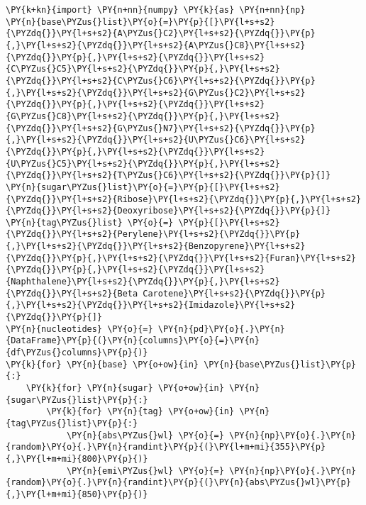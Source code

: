     \begin{tcolorbox}[breakable, size=fbox, boxrule=1pt, pad at break*=1mm,colback=cellbackground, colframe=cellborder]
\begin{Verbatim}[commandchars=\\\{\}]
\PY{k+kn}{import} \PY{n+nn}{numpy} \PY{k}{as} \PY{n+nn}{np}
\PY{n}{base\PYZus{}list}\PY{o}{=}\PY{p}{[}\PY{l+s+s2}{\PYZdq{}}\PY{l+s+s2}{A\PYZus{}C2}\PY{l+s+s2}{\PYZdq{}}\PY{p}{,}\PY{l+s+s2}{\PYZdq{}}\PY{l+s+s2}{A\PYZus{}C8}\PY{l+s+s2}{\PYZdq{}}\PY{p}{,}\PY{l+s+s2}{\PYZdq{}}\PY{l+s+s2}{C\PYZus{}C5}\PY{l+s+s2}{\PYZdq{}}\PY{p}{,}\PY{l+s+s2}{\PYZdq{}}\PY{l+s+s2}{C\PYZus{}C6}\PY{l+s+s2}{\PYZdq{}}\PY{p}{,}\PY{l+s+s2}{\PYZdq{}}\PY{l+s+s2}{G\PYZus{}C2}\PY{l+s+s2}{\PYZdq{}}\PY{p}{,}\PY{l+s+s2}{\PYZdq{}}\PY{l+s+s2}{G\PYZus{}C8}\PY{l+s+s2}{\PYZdq{}}\PY{p}{,}\PY{l+s+s2}{\PYZdq{}}\PY{l+s+s2}{G\PYZus{}N7}\PY{l+s+s2}{\PYZdq{}}\PY{p}{,}\PY{l+s+s2}{\PYZdq{}}\PY{l+s+s2}{U\PYZus{}C6}\PY{l+s+s2}{\PYZdq{}}\PY{p}{,}\PY{l+s+s2}{\PYZdq{}}\PY{l+s+s2}{U\PYZus{}C5}\PY{l+s+s2}{\PYZdq{}}\PY{p}{,}\PY{l+s+s2}{\PYZdq{}}\PY{l+s+s2}{T\PYZus{}C6}\PY{l+s+s2}{\PYZdq{}}\PY{p}{]}
\PY{n}{sugar\PYZus{}list}\PY{o}{=}\PY{p}{[}\PY{l+s+s2}{\PYZdq{}}\PY{l+s+s2}{Ribose}\PY{l+s+s2}{\PYZdq{}}\PY{p}{,}\PY{l+s+s2}{\PYZdq{}}\PY{l+s+s2}{Deoxyribose}\PY{l+s+s2}{\PYZdq{}}\PY{p}{]}
\PY{n}{tag\PYZus{}list} \PY{o}{=} \PY{p}{[}\PY{l+s+s2}{\PYZdq{}}\PY{l+s+s2}{Perylene}\PY{l+s+s2}{\PYZdq{}}\PY{p}{,}\PY{l+s+s2}{\PYZdq{}}\PY{l+s+s2}{Benzopyrene}\PY{l+s+s2}{\PYZdq{}}\PY{p}{,}\PY{l+s+s2}{\PYZdq{}}\PY{l+s+s2}{Furan}\PY{l+s+s2}{\PYZdq{}}\PY{p}{,}\PY{l+s+s2}{\PYZdq{}}\PY{l+s+s2}{Naphthalene}\PY{l+s+s2}{\PYZdq{}}\PY{p}{,}\PY{l+s+s2}{\PYZdq{}}\PY{l+s+s2}{Beta Carotene}\PY{l+s+s2}{\PYZdq{}}\PY{p}{,}\PY{l+s+s2}{\PYZdq{}}\PY{l+s+s2}{Imidazole}\PY{l+s+s2}{\PYZdq{}}\PY{p}{]}
\PY{n}{nucleotides} \PY{o}{=} \PY{n}{pd}\PY{o}{.}\PY{n}{DataFrame}\PY{p}{(}\PY{n}{columns}\PY{o}{=}\PY{n}{df\PYZus{}columns}\PY{p}{)}
\PY{k}{for} \PY{n}{base} \PY{o+ow}{in} \PY{n}{base\PYZus{}list}\PY{p}{:}
    \PY{k}{for} \PY{n}{sugar} \PY{o+ow}{in} \PY{n}{sugar\PYZus{}list}\PY{p}{:}
        \PY{k}{for} \PY{n}{tag} \PY{o+ow}{in} \PY{n}{tag\PYZus{}list}\PY{p}{:}
            \PY{n}{abs\PYZus{}wl} \PY{o}{=} \PY{n}{np}\PY{o}{.}\PY{n}{random}\PY{o}{.}\PY{n}{randint}\PY{p}{(}\PY{l+m+mi}{355}\PY{p}{,}\PY{l+m+mi}{800}\PY{p}{)}
            \PY{n}{emi\PYZus{}wl} \PY{o}{=} \PY{n}{np}\PY{o}{.}\PY{n}{random}\PY{o}{.}\PY{n}{randint}\PY{p}{(}\PY{n}{abs\PYZus{}wl}\PY{p}{,}\PY{l+m+mi}{850}\PY{p}{)}

\end{Verbatim}
\end{tcolorbox}

